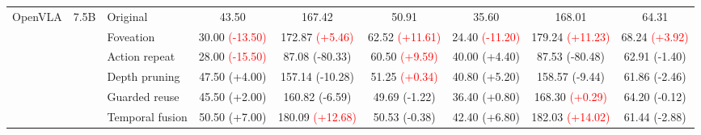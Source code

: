 \begin{table}[t]
\begin{tabular}{cclcccccc}
\multirow[c]{6}{*}{OpenVLA}
& \multirow[c]{6}{*}{7.5B}
& Original & 43.50 & 167.42 & 50.91 & 35.60 & 168.01 & 64.31 \\
& & Foveation & 30.00 {\scriptsize\textcolor{red}{(-13.50)}} & 172.87 {\scriptsize\textcolor{red}{(+5.46)}} & 62.52 {\scriptsize\textcolor{red}{(+11.61)}} & 24.40 {\scriptsize\textcolor{red}{(-11.20)}} & 179.24 {\scriptsize\textcolor{red}{(+11.23)}} & 68.24 {\scriptsize\textcolor{red}{(+3.92)}} \\
& & Action repeat & 28.00 {\scriptsize\textcolor{red}{(-15.50)}} & 87.08 {\scriptsize\textcolor{green!50!black}{(-80.33)}} & 60.50 {\scriptsize\textcolor{red}{(+9.59)}} & 40.00 {\scriptsize\textcolor{green!50!black}{(+4.40)}} & 87.53 {\scriptsize\textcolor{green!50!black}{(-80.48)}} & 62.91 {\scriptsize\textcolor{green!50!black}{(-1.40)}} \\
& & Depth pruning & 47.50 {\scriptsize\textcolor{green!50!black}{(+4.00)}} & 157.14 {\scriptsize\textcolor{green!50!black}{(-10.28)}} & 51.25 {\scriptsize\textcolor{red}{(+0.34)}} & 40.80 {\scriptsize\textcolor{green!50!black}{(+5.20)}} & 158.57 {\scriptsize\textcolor{green!50!black}{(-9.44)}} & 61.86 {\scriptsize\textcolor{green!50!black}{(-2.46)}} \\
& & Guarded reuse & 45.50 {\scriptsize\textcolor{green!50!black}{(+2.00)}} & 160.82 {\scriptsize\textcolor{green!50!black}{(-6.59)}} & 49.69 {\scriptsize\textcolor{green!50!black}{(-1.22)}} & 36.40 {\scriptsize\textcolor{green!50!black}{(+0.80)}} & 168.30 {\scriptsize\textcolor{red}{(+0.29)}} & 64.20 {\scriptsize\textcolor{green!50!black}{(-0.12)}} \\
& & Temporal fusion & 50.50 {\scriptsize\textcolor{green!50!black}{(+7.00)}} & 180.09 {\scriptsize\textcolor{red}{(+12.68)}} & 50.53 {\scriptsize\textcolor{green!50!black}{(-0.38)}} & 42.40 {\scriptsize\textcolor{green!50!black}{(+6.80)}} & 182.03 {\scriptsize\textcolor{red}{(+14.02)}} & 61.44 {\scriptsize\textcolor{green!50!black}{(-2.88)}} \\
\cmidrule(lr){1-9}


\end{tabular}
\end{table}
